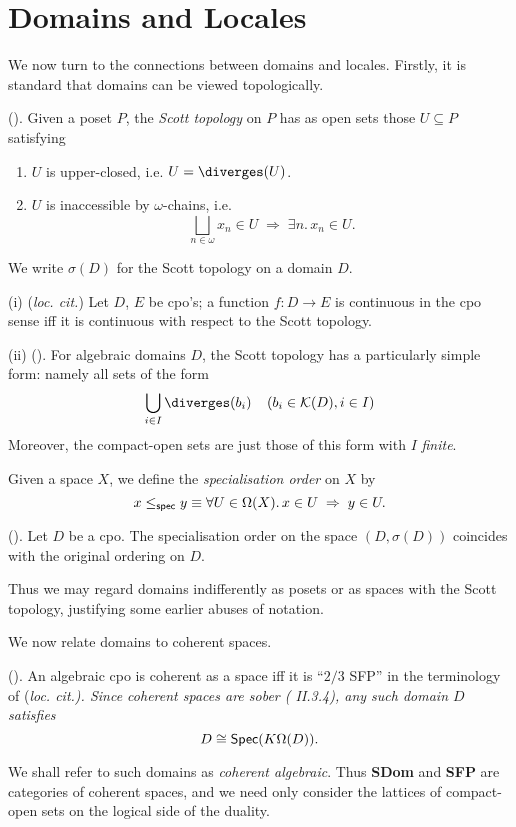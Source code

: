 \section{Domains and Locales}
We now turn to the connections between domains and locales.
Firstly, it is standard that domains can be viewed topologically.
\begin{definition}
{\rm (\cite[Chapter 1 p.\  16]{PloLN}). Given a poset $P$, the {\em Scott topology} on $P$ has as open sets those $U \subseteq P$ satisfying
\begin{enumerate}
\item $U$ is upper-closed, i.e. $U = \diverges (U)$.
\item $U$ is inaccessible by $\omega$-chains, i.e.
\[ \bigsqcup_{n \in \omega} x_{n} \in U \; \Rightarrow \;  \exists n. \, x_{n} \in U. \]
\end{enumerate}
We write $\sigma (D)$ for the Scott topology on a domain $D$.}
\end{definition}
\begin{proposition}
\label{cop}
(i) ({\it loc. cit.}) Let $D$, $E$ be cpo's; a function $f : D \rightarrow E$ 
is continuous in the cpo sense iff it is continuous with respect to the Scott topology.

\noindent (ii) (\cite[Chapter 6 p.\  3]{PloLN}). 
For algebraic domains $D$, the Scott topology has a particularly simple form: namely all sets of the form
\[ \bigcup_{i \in I} \diverges (b_{i}) \;\;\;\; (b_{i} \in {\cal K}(D), i \in I) \]
Moreover, the compact-open sets are just those of this form with $I$ {\em finite}.
\end{proposition}
Given a space $X$, we define the {\it specialisation order} on $X$ by
\[ x \leq_{\sf spec} y \equiv \forall U \in \Omega (X). \, x \in U \; \Rightarrow \; y \in U. \]
\begin{proposition}
(\cite[Chapter 1 p.\  16]{PloLN}). Let $D$ be a cpo. The specialisation order on the space $(D, \sigma (D))$ coincides with the original ordering on $D$.
\end{proposition}
Thus we may regard domains indifferently as posets or as spaces with the Scott topology, justifying some earlier abuses of notation.

We now relate domains to coherent spaces.
\begin{theorem}
(\cite[Chapter 8 p.\  41]{PloLN}). An algebraic cpo is coherent as a space iff it is ``$2/3$ SFP'' in the terminology of (\it loc. cit.).
Since coherent spaces are sober (\cite{Joh82} II.3.4), any such domain $D$ satisfies
\[ D \cong {\sf Spec}(K \Omega (D)). \]
\end{theorem}
We shall refer to such domains as {\em coherent algebraic}.
Thus {\bf SDom} and {\bf SFP} are categories of coherent spaces, and we need only consider the lattices of compact-open sets on the logical side of the duality.

